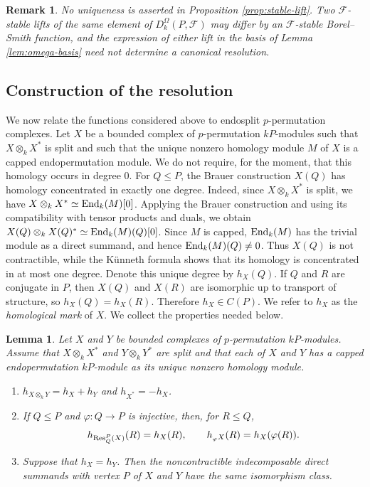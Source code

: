 \documentclass[preprint,12pt,3p]{elsarticle}
\newtheorem{lemma}[theorem]{Lemma}
\newtheorem{remark}[theorem]{Remark}%
\def\Res{{\rm Res}}
\def\End{{\rm End}}
\def\F{\mathcal{F}}
\begin{document}
\begin{remark}\label{rem:no-canonicity}
{\rm No uniqueness is asserted in Proposition \ref{prop:stable-lift}.  Two $\F$-stable lifts of the same element of $D_k^\Omega(P,\F)$ may differ by an $\F$-stable Borel--Smith function, and the expression of either lift in the basis of Lemma \ref{lem:omega-basis} need not determine a canonical resolution.}
\end{remark}

\subsection{Construction of the resolution}

We now relate the functions considered above to endosplit $p$-permutation complexes. Let $X$ be a bounded complex of $p$-permutation $kP$-modules such that $X\otimes_k X^*$ is split and such that the unique nonzero homology module $M$ of $X$ is a capped endopermutation module. We do not require, for the moment, that this homology occurs in degree $0$. For $Q\leq P$, the Brauer construction $X(Q)$ has homology concentrated in exactly one degree. Indeed, since $X\otimes_k X^*$ is split, we have $X\otimes_k X^*\simeq\End_k(M)[0]$. Applying the Brauer construction and using its compatibility with tensor products and duals, we obtain $X(Q)\otimes_k X(Q)^*\simeq\End_k(M)(Q)[0]$. Since $M$ is capped, $\End_k(M)$ has the trivial module as a direct summand, and hence $\End_k(M)(Q)\neq0$. Thus $X(Q)$ is not contractible, while the K\"unneth formula shows that its homology is concentrated in at most one degree. Denote this unique degree by $h_X(Q)$. If $Q$ and $R$ are conjugate in $P$, then $X(Q)$ and $X(R)$ are isomorphic up to transport of structure, so $h_X(Q)=h_X(R)$. Therefore $h_X\in C(P)$.  We refer to $h_X$ as the {\it homological mark} of $X$.  We collect the properties needed below.

\begin{lemma}\label{lem:h-marks}
Let $X$ and $Y$ be bounded complexes of $p$-permutation $kP$-modules. Assume that $X\otimes_k X^*$ and $Y\otimes_k Y^*$ are split and that each of $X$ and $Y$ has a capped endopermutation $kP$-module as its unique nonzero homology module.
\begin{enumerate}
\item $h_{X\otimes_k Y}=h_X+h_Y$ and $h_{X^*}=-h_X$.
\item If $Q\leq P$ and $\varphi:Q\to P$ is injective, then, for $R\leq Q$,
 $$
  h_{\Res_Q^P(X)}(R)=h_X(R),\qquad
  h_{{}_\varphi X}(R)=h_X(\varphi(R)).
 $$
\item Suppose that $h_X=h_Y$.  Then the noncontractible indecomposable direct summands with vertex $P$ of $X$ and $Y$ have the same isomorphism class.
\end{enumerate}
\end{lemma}
\end{document}
